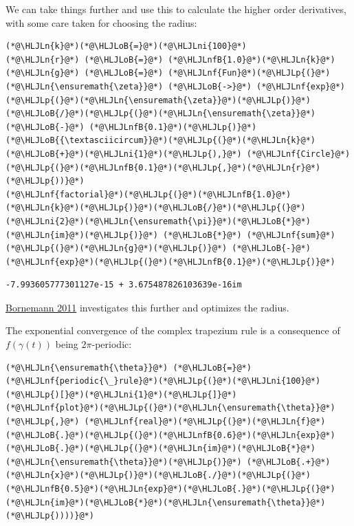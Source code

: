 \documentclass[12pt,a4paper]{article}
\newcommand{\HLJLn}[1]{#1}
\newcommand{\HLJLnf}[1]{\textcolor[RGB]{66,102,213}{#1}}
\newcommand{\HLJLnfB}[1]{\textcolor[RGB]{59,151,46}{#1}}
\newcommand{\HLJLni}[1]{\textcolor[RGB]{59,151,46}{#1}}
\newcommand{\HLJLoB}[1]{\textcolor[RGB]{102,102,102}{\textbf{#1}}}
\newcommand{\HLJLp}[1]{#1}
\begin{document}
We can take things further and use this to calculate the higher order derivatives, with some care taken for choosing the radius:


\begin{lstlisting}
(*@\HLJLn{k}@*)(*@\HLJLoB{=}@*)(*@\HLJLni{100}@*)
(*@\HLJLn{r}@*) (*@\HLJLoB{=}@*) (*@\HLJLnfB{1.0}@*)(*@\HLJLn{k}@*)
(*@\HLJLn{g}@*) (*@\HLJLoB{=}@*) (*@\HLJLnf{Fun}@*)(*@\HLJLp{(}@*) (*@\HLJLn{\ensuremath{\zeta}}@*) (*@\HLJLoB{->}@*) (*@\HLJLnf{exp}@*)(*@\HLJLp{(}@*)(*@\HLJLn{\ensuremath{\zeta}}@*)(*@\HLJLp{)}@*)(*@\HLJLoB{/}@*)(*@\HLJLp{(}@*)(*@\HLJLn{\ensuremath{\zeta}}@*) (*@\HLJLoB{-}@*) (*@\HLJLnfB{0.1}@*)(*@\HLJLp{)}@*)(*@\HLJLoB{{\textasciicircum}}@*)(*@\HLJLp{(}@*)(*@\HLJLn{k}@*)(*@\HLJLoB{+}@*)(*@\HLJLni{1}@*)(*@\HLJLp{),}@*) (*@\HLJLnf{Circle}@*)(*@\HLJLp{(}@*)(*@\HLJLnfB{0.1}@*)(*@\HLJLp{,}@*)(*@\HLJLn{r}@*)(*@\HLJLp{))}@*)
(*@\HLJLnf{factorial}@*)(*@\HLJLp{(}@*)(*@\HLJLnfB{1.0}@*)(*@\HLJLn{k}@*)(*@\HLJLp{)}@*)(*@\HLJLoB{/}@*)(*@\HLJLp{(}@*)(*@\HLJLni{2}@*)(*@\HLJLn{\ensuremath{\pi}}@*)(*@\HLJLoB{*}@*)(*@\HLJLn{im}@*)(*@\HLJLp{)}@*) (*@\HLJLoB{*}@*) (*@\HLJLnf{sum}@*)(*@\HLJLp{(}@*)(*@\HLJLn{g}@*)(*@\HLJLp{)}@*) (*@\HLJLoB{-}@*) (*@\HLJLnf{exp}@*)(*@\HLJLp{(}@*)(*@\HLJLnfB{0.1}@*)(*@\HLJLp{)}@*)
\end{lstlisting}

\begin{lstlisting}
-7.993605777301127e-15 + 3.675487826103639e-16im
\end{lstlisting}


\href{https://www-m3.ma.tum.de/foswiki/pub/M3/Allgemeines/FolkmarBornemannPublications/FoCM_Stability_Cauchy_Integrals.pdf}{Bornemann 2011}  investigates this further and optimizes the radius.

The exponential convergence of the complex trapezium rule is a consequence of $f(\gamma(t))$ being 2\ensuremath{\pi}-periodic:


\begin{lstlisting}
(*@\HLJLn{\ensuremath{\theta}}@*) (*@\HLJLoB{=}@*) (*@\HLJLnf{periodic{\_}rule}@*)(*@\HLJLp{(}@*)(*@\HLJLni{100}@*)(*@\HLJLp{)[}@*)(*@\HLJLni{1}@*)(*@\HLJLp{]}@*)
(*@\HLJLnf{plot}@*)(*@\HLJLp{(}@*)(*@\HLJLn{\ensuremath{\theta}}@*)(*@\HLJLp{,}@*) (*@\HLJLnf{real}@*)(*@\HLJLp{(}@*)(*@\HLJLn{f}@*)(*@\HLJLoB{.}@*)(*@\HLJLp{(}@*)(*@\HLJLnfB{0.6}@*)(*@\HLJLn{exp}@*)(*@\HLJLoB{.}@*)(*@\HLJLp{(}@*)(*@\HLJLn{im}@*)(*@\HLJLoB{*}@*)(*@\HLJLn{\ensuremath{\theta}}@*)(*@\HLJLp{)}@*) (*@\HLJLoB{.+}@*) (*@\HLJLn{x}@*)(*@\HLJLp{)}@*)(*@\HLJLoB{./}@*)(*@\HLJLp{(}@*)(*@\HLJLnfB{0.5}@*)(*@\HLJLn{exp}@*)(*@\HLJLoB{.}@*)(*@\HLJLp{(}@*)(*@\HLJLn{im}@*)(*@\HLJLoB{*}@*)(*@\HLJLn{\ensuremath{\theta}}@*)(*@\HLJLp{))))}@*)
\end{lstlisting}
\end{document}
